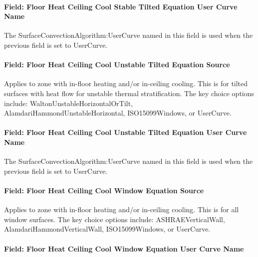 \paragraph{Field: Floor Heat Ceiling Cool Stable Tilted Equation User Curve Name}\label{field-floor-heat-ceiling-cool-stable-tilted-equation-user-curve-name}

The SurfaceConvectionAlgorithm:UserCurve named in this field is used when the previous field is set to UserCurve.

\paragraph{Field: Floor Heat Ceiling Cool Unstable Tilted Equation Source}\label{field-floor-heat-ceiling-cool-unstable-tilted-equation-source}

Applies to zone with in-floor heating and/or in-ceiling cooling. This is for tilted surfaces with heat flow for unstable thermal stratification. The key choice options include: WaltonUnstableHorizontalOrTilt, AlamdariHammondUnstableHorizontal, ISO15099Windows, or UserCurve.

\paragraph{Field: Floor Heat Ceiling Cool Unstable Tilted Equation User Curve Name}\label{field-floor-heat-ceiling-cool-unstable-tilted-equation-user-curve-name}

The SurfaceConvectionAlgorithm:UserCurve named in this field is used when the previous field is set to UserCurve.

\paragraph{Field: Floor Heat Ceiling Cool Window Equation Source}\label{field-floor-heat-ceiling-cool-window-equation-source}

Applies to zone with in-floor heating and/or in-ceiling cooling. This is for all window surfaces. The key choice options include: ASHRAEVerticalWall, AlamdariHammondVerticalWall, ISO15099Windows, or UserCurve.

\paragraph{Field: Floor Heat Ceiling Cool Window Equation User Curve Name}\label{field-floor-heat-ceiling-cool-window-equation-user-curve-name}


